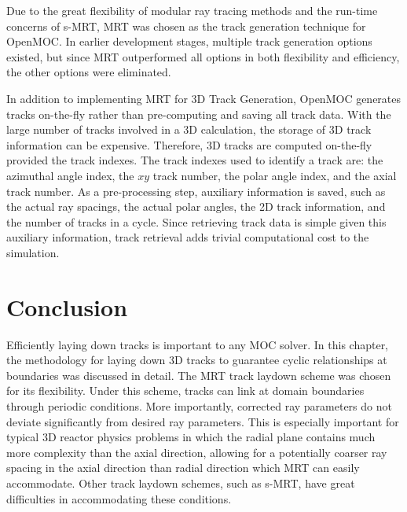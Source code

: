Due to the great flexibility of modular ray tracing methods and the run-time concerns of \ac{s-MRT}, \ac{MRT} was chosen as the track generation technique for OpenMOC. In earlier development stages, multiple track generation options existed, but since \ac{MRT} outperformed all options in both flexibility and efficiency, the other options were eliminated.

In addition to implementing \ac{MRT} for 3D Track Generation, OpenMOC generates tracks on-the-fly rather than pre-computing and saving all track data. With the large number of tracks involved in a 3D calculation, the storage of 3D track information can be expensive. Therefore, 3D tracks are computed on-the-fly provided the track indexes. The track indexes used to identify a track are: the azimuthal angle index, the $xy$ track number, the polar angle index, and the axial track number. As a pre-processing step, auxiliary information is saved, such as the actual ray spacings, the actual polar angles, the 2D track information, and the number of tracks in a cycle. Since retrieving track data is simple given this auxiliary information, track retrieval adds trivial computational cost to the simulation.

\section{Conclusion}
\label{sec:tg-conclusion}

Efficiently laying down tracks is important to any \ac{MOC} solver. In this chapter, the methodology for laying down 3D tracks to guarantee cyclic relationships at boundaries was discussed in detail. The \ac{MRT} track laydown scheme was chosen for its flexibility. Under this scheme, tracks can link at domain boundaries through periodic conditions. More importantly, corrected ray parameters do not deviate significantly from desired ray parameters. This is especially important for typical 3D reactor physics problems in which the radial plane contains much more complexity than the axial direction, allowing for a potentially coarser ray spacing in the axial direction than radial direction which \ac{MRT} can easily accommodate. Other track laydown schemes, such as \ac{s-MRT}, have great difficulties in accommodating these conditions. 


